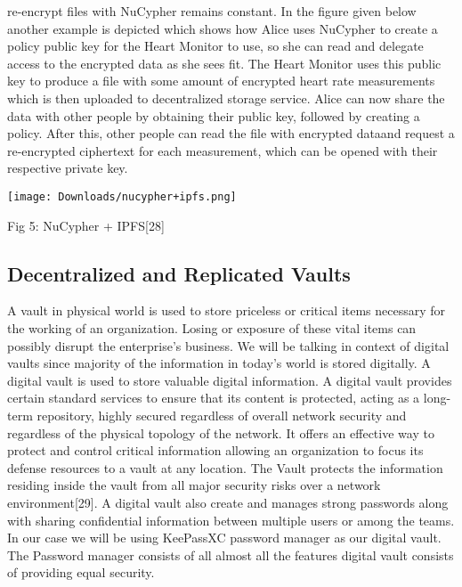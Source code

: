 \documentclass[12pt]{article}
\begin{document}
re-encrypt files with NuCypher remains constant. In the figure given below another example is depicted which shows how Alice uses NuCypher to create a policy public key for the Heart Monitor to use, so she can read and delegate access to the encrypted data as she sees fit. The Heart Monitor uses this public key to produce a file with some amount of encrypted heart rate measurements which is then uploaded to decentralized storage service. Alice can now share the data with other people by obtaining their public key, followed by creating a policy. After this, other people can read the file with encrypted dataand request a re-encrypted ciphertext for each measurement, which can be opened with their respective private key.

\texttt{[image: Downloads/nucypher+ipfs.png]}
 
\caption{Fig 5: NuCypher + IPFS[28] }


\subsection{Decentralized and Replicated Vaults}

 A vault in physical world is used to store priceless or critical items necessary for the working of an organization. Losing or exposure of these vital items can possibly disrupt the enterprise’s business. We will be talking in context of digital vaults since majority of the information in today’s world is stored digitally. A digital vault is used to store valuable digital information. A digital vault provides certain standard services to ensure that its content is protected, acting as a long-term repository, highly secured regardless of overall network security and regardless of the physical topology of the network. It offers an effective way to protect and control critical information allowing an organization to focus its defense resources to a vault at any location. The Vault protects the information residing inside the vault from all major security risks over a network environment[29]. A digital vault also create and manages strong passwords along with sharing confidential information between multiple users or among the teams. In our case we will be using KeePassXC password manager as our digital vault. The Password manager consists of all almost all the features digital vault consists of providing equal security. 
\end{document}
